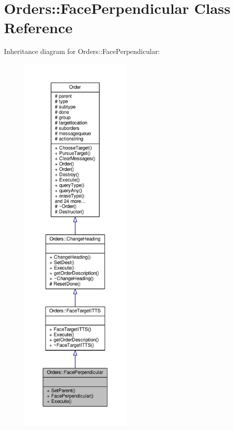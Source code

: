 \hypertarget{classOrders_1_1FacePerpendicular}{}\section{Orders\+:\+:Face\+Perpendicular Class Reference}
\label{classOrders_1_1FacePerpendicular}


Inheritance diagram for Orders\+:\+:Face\+Perpendicular\+:
\nopagebreak
\begin{figure}[H]
\begin{center}
\leavevmode
\includegraphics[height=550pt]{df/d61/classOrders_1_1FacePerpendicular__inherit__graph}
\end{center}
\end{figure}


